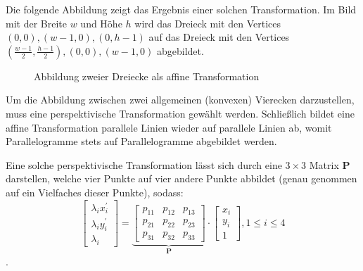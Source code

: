 \documentclass{whswinvcbook}
\begin{document}
Die folgende Abbildung zeigt das Ergebnis einer solchen Transformation. Im Bild mit der Breite $w$ und Höhe $h$ wird das Dreieck mit den Vertices $(0,0),(w-1,0),(0,h-1)$ auf das Dreieck mit den Vertices $(\frac{w-1}{2},\frac{h-1}{2}),(0,0),(w-1,0)$ abgebildet.
\begin{figure}[H]
    \centering
    \quad\quad\quad\quad
    \caption{Abbildung zweier Dreiecke als affine Transformation}
    \label{fig-opencv-affine-2}
\end{figure}
Um die Abbildung zwischen zwei allgemeinen (konvexen) Vierecken darzustellen, muss eine perspektivische Transformation gewählt werden. Schließlich bildet eine affine Transformation parallele Linien wieder auf parallele Linien ab, womit Parallelogramme stets auf Parallelogramme abgebildet werden.

Eine solche perspektivische Transformation lässt sich durch eine $3\times3$ Matrix $\mathbf{P}$ darstellen, welche vier Punkte auf vier andere Punkte abbildet (genau genommen auf ein Vielfaches dieser Punkte), sodass: $$\begin{bmatrix}\lambda_i x_i^\prime\\\lambda_i y_i^\prime\\\lambda_i\end{bmatrix}=\underbrace{\begin{bmatrix}p_{11}&p_{12}&p_{13}\\p_{21}&p_{22}&p_{23}\\p_{31}&p_{32}&p_{33}\end{bmatrix}}_{\mathbf{P}}\cdot\begin{bmatrix}x_i\\y_i\\1\end{bmatrix},1\leq i\leq4$$.
\end{document}

